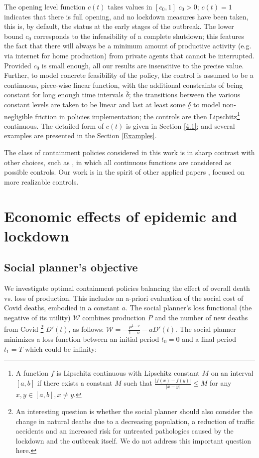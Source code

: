 \documentclass{amsart}
\begin{document}
The opening level function $c(t) $ takes values in $[c_0,1]$
$c_0>0$;
$c(t)=1$ indicates that there is full 
opening, and no lockdown measures have been taken,
this is, by default, the status at the early stages of the outbreak. 
The lower bound $c_0$ corresponds to the infeasibility of
a complete shutdown;  this features the fact that there will always be a minimum amount of productive activity (e.g. 
via internet for home production) from private agents that cannot be interrupted.
Provided $c_0$ is small enough, all
our results are insensitive to the precise value. Further, to model concrete feasibility of the policy, the control is assumed to be a continuous, piece-wise linear function, with the
additional constraints of being constant for 
long enough time intervals $\overline \delta$; the transitions between the 
various  constant levels are taken to be linear
and last at least some $\underline \delta$ to model
non-negligible
friction in policies implementation; the controls are
then Lipschitz\footnote{A function $f$ is Lipschitz continuous with Lipschitz constant $M$ on an interval $[a,b]$ if there exists a constant $M$ such that $\frac{|f(x)-f(y)|}{|x-y|}\leq M$ for any $x,y\in [a,b], x\neq y$.} continuous.
The detailed form of $c(t)$ is given in Section \ref{4.1};
and several examples are presented in the Section \ref{Examples}. 

The class of containment policies considered in this work is 
in sharp contrast with other choices, such as \cite{GKK}, in which
all continuous functions are considered as possible controls.
Our work is in the spirit of other applied papers
\cite{RA}, focused on more realizable controls.


\section{Economic effects of epidemic and lockdown}

\subsection{Social planner's objective}

We investigate optimal containment policies balancing the 
effect of overall death vs. loss of production. 
This includes an a-priori evaluation of the social cost
of Covid deaths, embodied in a constant $a$.
The social planner's loss functional (the negative of its utility) $\mathcal{W}$ combines production $P$
and the number of new deaths from Covid \footnote{An interesting question is whether the social planner should also consider the 
change  in natural deaths due to
a decreasing population, a reduction of
traffic accidents and an increased 
risk for untreated pathologies caused by the
lockdown and the outbreak itself. We do not address this important question here.}  $D'(t)$, as follows: $\mathcal{W}=-\frac{P^{1-\sigma}}{1-\sigma}-aD'(t)$.
The social planner minimizes a loss function between an initial period
$t_0=0$ and a final period $t_{1}=T$ which could be infinity:
\end{document}
